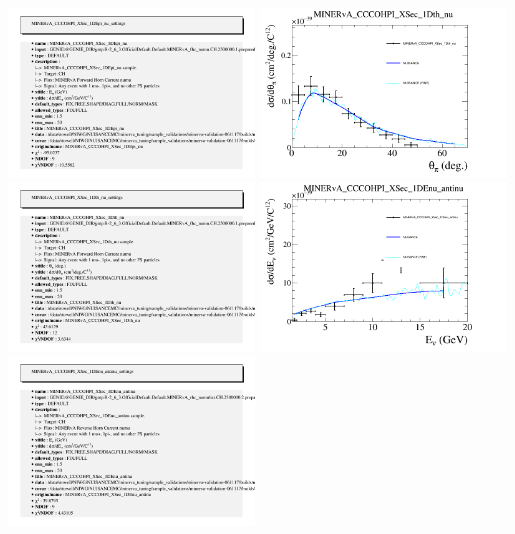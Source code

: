 \documentclass{article}
\begin{document}
\includegraphics[width=0.49\textwidth]{figures/nuisance_MINERvA_CCCOHPI_XSec_1DEpi_nu_info.png}
\centering
\includegraphics[width=0.49\textwidth]{figures/nuisance_MINERvA_CCCOHPI_XSec_1Dth_nu_comp.png}
\includegraphics[width=0.49\textwidth]{figures/nuisance_MINERvA_CCCOHPI_XSec_1Dth_nu_info.png}
\centering
\includegraphics[width=0.49\textwidth]{figures/nuisance_MINERvA_CCCOHPI_XSec_1DEnu_antinu_comp.png}
\includegraphics[width=0.49\textwidth]{figures/nuisance_MINERvA_CCCOHPI_XSec_1DEnu_antinu_info.png}
\end{document}

